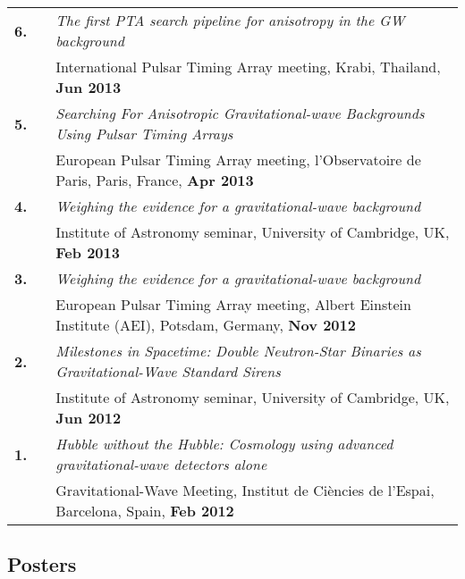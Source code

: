 \documentclass[11pt,letterpaper,sans]{moderncv}
\begin{document}
{\begin{longtable}{rp{0.3cm}p{15.8cm}}
\textbf{6.} & & \textit{The first PTA search pipeline for anisotropy in the GW background} \\ 
&& International Pulsar Timing Array meeting, Krabi, Thailand, \textbf{Jun 2013} \vspace{0.09cm}\\
\textbf{5.} & & \textit{Searching For Anisotropic Gravitational-wave Backgrounds Using Pulsar Timing Arrays} \\ 
&& European Pulsar Timing Array meeting, l'Observatoire de Paris, Paris, France, \textbf{Apr 2013} \vspace{0.09cm}\\
\textbf{4.} & & \textit{Weighing the evidence for a gravitational-wave background} \\ 
&& Institute of Astronomy seminar, University of Cambridge, UK, \textbf{Feb 2013} \vspace{0.09cm}\\
\textbf{3.} & & \textit{Weighing the evidence for a gravitational-wave background} \\ 
&& European Pulsar Timing Array meeting, Albert Einstein Institute (AEI), Potsdam, Germany, \textbf{Nov 2012} \vspace{0.09cm}\\
\textbf{2.} & & \textit{Milestones in Spacetime: Double Neutron-Star Binaries as Gravitational-Wave Standard Sirens} \\ 
&& Institute of Astronomy seminar, University of Cambridge, UK, \textbf{Jun 2012} \vspace{0.09cm}\\
\textbf{1.} & & \textit{Hubble without the Hubble: Cosmology using advanced gravitational-wave detectors alone} \\ 
&& Gravitational-Wave Meeting, Institut de Ci\`encies de l'Espai, Barcelona, Spain, \textbf{Feb 2012} 
\end{longtable}
}

\subsection{Posters}\vspace{-0.6cm}
\end{document}
